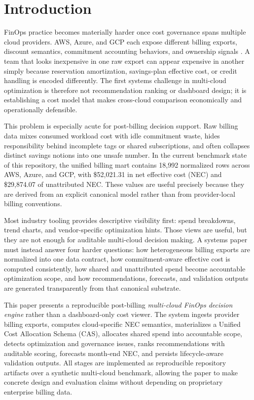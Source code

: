 \section{Introduction}
\label{sec:introduction}

FinOps practice becomes materially harder once cost governance spans multiple cloud providers. AWS, Azure, and GCP each expose different billing exports, discount semantics, commitment accounting behaviors, and ownership signals \cite{aws_line_items,azure_amortized_cost,gcp_standard_export}. A team that looks inexpensive in one raw export can appear expensive in another simply because reservation amortization, savings-plan effective cost, or credit handling is encoded differently. The first systems challenge in multi-cloud optimization is therefore not recommendation ranking or dashboard design; it is establishing a cost model that makes cross-cloud comparison economically and operationally defensible.

This problem is especially acute for post-billing decision support. Raw billing data mixes consumed workload cost with idle commitment waste, hides responsibility behind incomplete tags or shared subscriptions, and often collapses distinct savings notions into one unsafe number. In the current benchmark state of this repository, the unified billing mart contains 18{,}992 normalized rows across AWS, Azure, and GCP, with \$52{,}021.31 in net effective cost (NEC) and \$29{,}874.07 of unattributed NEC. These values are useful precisely because they are derived from an explicit canonical model rather than from provider-local billing conventions.

Most industry tooling provides descriptive visibility first: spend breakdowns, trend charts, and vendor-specific optimization hints. Those views are useful, but they are not enough for auditable multi-cloud decision making. A systems paper must instead answer four harder questions: how heterogeneous billing exports are normalized into one data contract, how commitment-aware effective cost is computed consistently, how shared and unattributed spend become accountable optimization scope, and how recommendations, forecasts, and validation outputs are generated transparently from that canonical substrate.

This paper presents a reproducible post-billing \emph{multi-cloud FinOps decision engine} rather than a dashboard-only cost viewer. The system ingests provider billing exports, computes cloud-specific NEC semantics, materializes a Unified Cost Allocation Schema (CAS), allocates shared spend into accountable scope, detects optimization and governance issues, ranks recommendations with auditable scoring, forecasts month-end NEC, and persists lifecycle-aware validation outputs. All stages are implemented as reproducible repository artifacts over a synthetic multi-cloud benchmark, allowing the paper to make concrete design and evaluation claims without depending on proprietary enterprise billing data.

